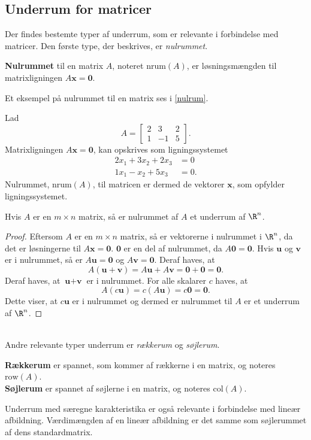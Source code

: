 \subsection{Underrum for matricer}
Der findes bestemte typer af underrum, som er relevante i forbindelse med matricer. Den første type, der beskrives, er \textit{nulrummet}.
%
\begin{defn}{}{}
\textbf{Nulrummet} til en matrix $A$, noteret $\text{nrum}(A)$, er løsningsmængden til matrixligningen $A\textbf{x}=\textbf{0}$. 
\end{defn}
%
\noindent
Et eksempel på nulrummet til en matrix ses i \ref{nulrum}.\\
%
\begin{eks}
\label{nulrum}
Lad 
$$A=\begin{bmatrix}
2 & 3 & 2\\
1 & -1 & 5
\end{bmatrix}.$$
Matrixligningen $A\textbf{x}=\textbf{0}$,
kan opskrives som ligningssystemet
\begin{align*}
2x_1+3x_2+2x_3&=0\\
1x_1-x_2+5x_3&=0.
\end{align*}
Nulrummet, $\text{nrum}(A)$, til matricen er dermed de vektorer $\textbf{x}$, som opfylder ligningssystemet.
\end{eks} 
%
\begin{thm}{}{}
Hvis $A$ er en $m\times n$ matrix, så er nulrummet af $A$ et underrum af $\R^n$.
\end{thm}
%
\begin{proof}
Eftersom $A$ er en $m\times n$ matrix, så er vektorerne i nulrummet i $\R^n$, da det er løsningerne til $A\textbf{x}=\textbf{0}$. $\textbf{0}$ er en del af nulrummet, da $A\textbf{0}=\textbf{0}$. 
Hvis $\textbf{u}$ og $\textbf{v}$ er i nulrummet, så er $A\textbf{u}=\textbf{0}$ og $A\textbf{v}=\textbf{0}$. 
Deraf haves, at
%
$$A(\textbf{u}+\textbf{v})=A\textbf{u}+A\textbf{v}=\textbf{0}+\textbf{0}=\textbf{0}.$$
%
Deraf haves, at $\textbf{u}+\textbf{v}$ er i nulrummet. 
For alle skalarer $c$ haves, at
$$A(c\textbf{u})=c(A\textbf{u})=c\textbf{0}=\textbf{0}.$$
Dette viser, at $c\textbf{u}$ er i nulrummet og dermed er nulrummet til $A$ er et underrum af $\R^n$.
\end{proof}
\\
\noindent
Andre relevante typer underrum er \textit{rækkerum} og \textit{søjlerum}.
%
\begin{defn}{}{}
\textbf{Rækkerum} er spannet, som kommer af rækkerne i en matrix, og noteres $\text{row}(A)$.
\\
\textbf{Søjlerum} er spannet af søjlerne i en matrix, og noteres $\text{col}(A)$.
\end{defn}
\noindent
Underrum med særegne karakteristika er også relevante i forbindelse med lineær afbildning.
Værdimængden af en lineær afbildning er det samme som søjlerummet af dens standardmatrix.
%
